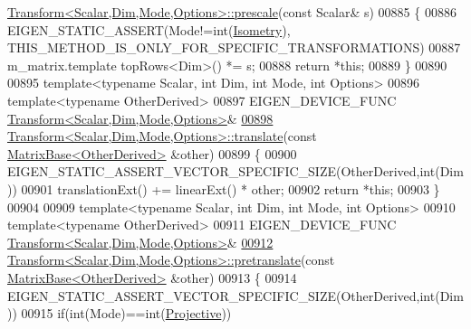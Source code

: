 \begin{DoxyCode}
      \hyperlink{group___geometry___module_class_eigen_1_1_transform}{Transform<Scalar,Dim,Mode,Options>::prescale}(\textcolor{keyword}{const} Scalar& s)
00885 \{
00886   EIGEN\_STATIC\_ASSERT(Mode!=\textcolor{keywordtype}{int}(\hyperlink{group__enums_ggaee59a86102f150923b0cac6d4ff05107a080cd5366173608f701cd945c2335568}{Isometry}), THIS\_METHOD\_IS\_ONLY\_FOR\_SPECIFIC\_TRANSFORMATIONS)
00887   m\_matrix.template topRows<Dim>() *= s;
00888   \textcolor{keywordflow}{return} *\textcolor{keyword}{this};
00889 \}
00890 
00895 \textcolor{keyword}{template}<\textcolor{keyword}{typename} Scalar, \textcolor{keywordtype}{int} Dim, \textcolor{keywordtype}{int} Mode, \textcolor{keywordtype}{int} Options>
00896 \textcolor{keyword}{template}<\textcolor{keyword}{typename} OtherDerived>
00897 EIGEN\_DEVICE\_FUNC \hyperlink{group___geometry___module_class_eigen_1_1_transform}{Transform<Scalar,Dim,Mode,Options>}&
\hyperlink{group___geometry___module_ad9817324c0366450314c853b55d7f15d}{00898} \hyperlink{group___geometry___module_class_eigen_1_1_transform}{Transform<Scalar,Dim,Mode,Options>::translate}(\textcolor{keyword}{const} 
      \hyperlink{group___core___module_class_eigen_1_1_matrix_base}{MatrixBase<OtherDerived>} &other)
00899 \{
00900   EIGEN\_STATIC\_ASSERT\_VECTOR\_SPECIFIC\_SIZE(OtherDerived,\textcolor{keywordtype}{int}(Dim))
00901   translationExt() += linearExt() * other;
00902   \textcolor{keywordflow}{return} *\textcolor{keyword}{this};
00903 \}
00904 
00909 \textcolor{keyword}{template}<\textcolor{keyword}{typename} Scalar, \textcolor{keywordtype}{int} Dim, \textcolor{keywordtype}{int} Mode, \textcolor{keywordtype}{int} Options>
00910 \textcolor{keyword}{template}<\textcolor{keyword}{typename} OtherDerived>
00911 EIGEN\_DEVICE\_FUNC \hyperlink{group___geometry___module_class_eigen_1_1_transform}{Transform<Scalar,Dim,Mode,Options>}&
\hyperlink{group___geometry___module_a5cd0403d30d4c3d964d8abac294c5e2f}{00912} \hyperlink{group___geometry___module_class_eigen_1_1_transform}{Transform<Scalar,Dim,Mode,Options>::pretranslate}(\textcolor{keyword}{const} 
      \hyperlink{group___core___module_class_eigen_1_1_matrix_base}{MatrixBase<OtherDerived>} &other)
00913 \{
00914   EIGEN\_STATIC\_ASSERT\_VECTOR\_SPECIFIC\_SIZE(OtherDerived,\textcolor{keywordtype}{int}(Dim))
00915   \textcolor{keywordflow}{if}(\textcolor{keywordtype}{int}(Mode)==\textcolor{keywordtype}{int}(\hyperlink{group__enums_ggaee59a86102f150923b0cac6d4ff05107aead6a2de12a17aaa4f5c523215dfccad}{Projective}))

\end{DoxyCode}
